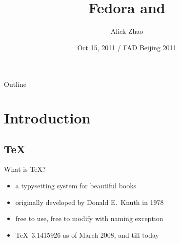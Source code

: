 \documentclass{beamer}
\title %
{Fedora and \TL}
\author[alick] %
{Alick Zhao\inst{1}}
\institute[Tsinghua University] %
{
  \texttt{alick9188@gmail.com}\\
  Department of Electronic Engineering\\
  Tsinghua University
}
\date[FAD Beijing 2011] %
{Oct 15, 2011 / FAD Beijing 2011}
\begin{document}
\begin{frame}
  \titlepage
\end{frame}

\begin{frame}{Outline}
  \tableofcontents
\end{frame}




\section{Introduction}

\subsection{\TeX}

\begin{frame}{What is \TeX ?}

  \begin{itemize}
    \item a typysetting system for beautiful books
    \item originally developed by Donald E.~Knuth in 1978
    \item free to use, free to modify with naming exception
    \item \TeX\ 3.1415926 as of March 2008, and till today
  \end{itemize}
\end{frame}
\end{document}
